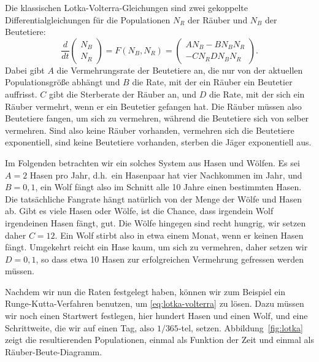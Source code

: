 Die klassischen Lotka-Volterra-Gleichungen sind zwei gekoppelte
Differentialgleichungen für die Populationen $N_R$ der Räuber und
$N_B$ der Beutetiere:
\begin{equation}
  \label{eq:lotka-volterra}
  \frac{d}{dt}
  \begin{pmatrix}
    N_B\\
    N_R
  \end{pmatrix}
  = F(N_B, N_R) = 
  \begin{pmatrix}
    A N_B  - B N_BN_R\\
    -C N_R  D N_BN_R
  \end{pmatrix}.
\end{equation}
Dabei gibt $A$ die Vermehrungsrate der Beutetiere an, die nur von der
aktuellen Populationsgröße abhängt und $B$ die Rate, mit der ein
Räuber ein Beutetier auffrisst. $C$ gibt die Sterberate der Räuber an,
und $D$ die Rate, mit der sich ein Räuber vermehrt, wenn er ein
Beutetier gefangen hat. Die Räuber müssen also Beutetiere fangen, um
sich zu vermehren, während die Beutetiere sich von selber
vermehren. Sind also keine Räuber vorhanden, vermehren sich die
Beutetiere exponentiell, sind keine Beutetiere vorhanden, sterben die
Jäger exponentiell aus.

Im Folgenden betrachten wir ein solches System aus Hasen und
Wölfen. Es sei $A=2$ Hasen pro Jahr, d.h.\ ein Hasenpaar hat vier
Nachkommen im Jahr, und $B=0,1$, ein Wolf fängt also im Schnitt alle
10 Jahre einen bestimmten Hasen. Die tatsächliche Fangrate hängt
natürlich von der Menge der Wölfe und Hasen ab. Gibt es viele Hasen
oder Wölfe, ist die Chance, dass irgendein Wolf irgendeinen Hasen
fängt, gut. Die Wölfe hingegen sind recht hungrig, wir setzen daher
$C=12$. Ein Wolf stirbt also in etwa einem Monat, wenn er keinen Hasen
fängt. Umgekehrt reicht ein Hase kaum, um sich zu vermehren, daher
setzen wir $D=0,1$, so dass etwa 10 Hasen zur erfolgreichen Vermehrung
gefressen werden müssen.

Nachdem wir nun die Raten festgelegt haben, können wir zum Beispiel
ein Runge-Kutta-Verfahren benutzen, um \eqref{eq:lotka-volterra} zu
lösen. Dazu müssen wir noch einen Startwert festlegen, hier hundert
Hasen und einen Wolf, und eine Schrittweite, die wir auf einen Tag,
also $1/365$-tel, setzen. Abbildung~\ref{fig:lotka} zeigt die
resultierenden Populationen, einmal als Funktion der Zeit und einmal
als Räuber-Beute-Diagramm.

